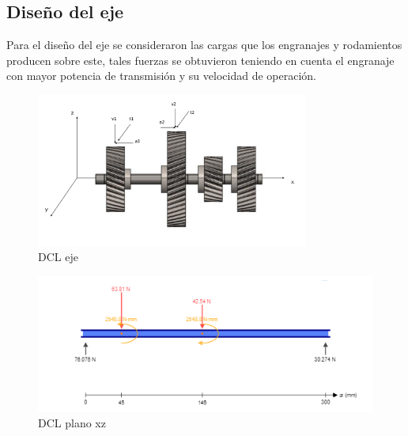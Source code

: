 \newpage\subsection{Diseño del eje}
Para el diseño del eje se consideraron las cargas que los engranajes y rodamientos producen sobre este, tales fuerzas se obtuvieron teniendo en cuenta el engranaje con mayor potencia de transmisión y su velocidad de operación.

\begin{figure}[ht!]
    \centering
    \includegraphics[height = 0.4\textheight,width=0.8\textwidth]{Cap5_DisenoDetallado/Figuras/Eje/DCL.pdf}
    \caption{DCL eje}
    \label{fig:DCL eje}
\end{figure}


\begin{figure}[ht!]
    \centering
    \includegraphics{Cap5_DisenoDetallado/Figuras/Eje/ejexz.PNG}
    \caption{DCL plano xz}
    \label{fig:ejexz}
\end{figure}

